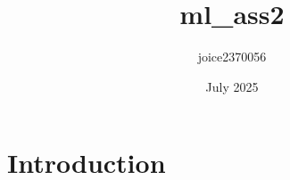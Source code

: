 \documentclass{article}
\title{ml_ass2}
\author{joice2370056 }
\date{July 2025}
\begin{document}
\maketitle

\section{Introduction}
\end{document}
